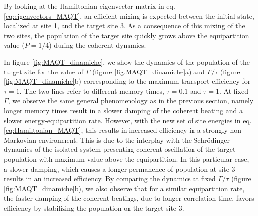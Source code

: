 \documentclass[12pt, amsmath, amssymb, graphicx]{iopart}
\begin{document}
By looking at the Hamiltonian eigenvector matrix in eq. \ref{eq:eigenvectors_MAQT}, an efficient mixing is expected between the initial state, localized at site 1, and the target site 3. As a consequence of this mixing of the two sites, the population of the target site quickly grows above the equipartition value ($P = 1/4$) during the coherent dynamics.

In figure \ref{fig:MAQT_dinamiche}, we show the dynamics of the population of the target site for the value of $\Gamma$ (figure \ref{fig:MAQT_dinamiche}a) and $\Gamma/\tau$ (figure \ref{fig:MAQT_dinamiche}b) corresponding to the maximum transport efficiency for $\tau = 1$.
The two lines refer to different memory times, $\tau = 0.1$ and $\tau = 1$.
At fixed $\Gamma$, we observe the same general phenomenology as in the previous section, namely longer memory times result in a slower damping of the coherent beating and a slower energy-equipartition rate.
However, with the new set of site energies in eq. \ref{eq:Hamiltonian_MAQT}, this results in increased efficiency in a strongly non-Markovian environment.
This is due to the interplay with the Schr\"odinger dynamics of the isolated system presenting coherent oscillation of the target population with maximum value above the equipartition.
In this particular case, a slower damping, which causes a longer permanence of population at site 3 results in an increased efficiency.
By comparing the dynamics at fixed $\Gamma/\tau$ (figure \ref{fig:MAQT_dinamiche}b), we also observe that for a similar equipartition rate, the faster damping of the coherent beatings, due to longer correlation time, favors efficiency by stabilizing the population on the target site 3.
\end{document}
